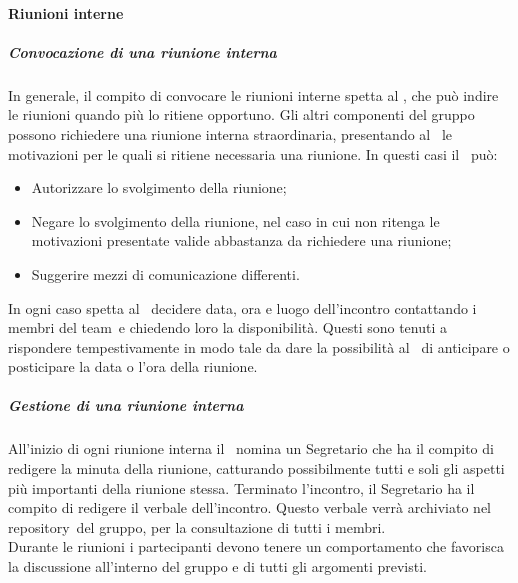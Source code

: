 \documentclass[../NormeProgetto.tex]{subfiles}
\begin{document}
			\paragraph{Riunioni interne}
			\subparagraph{Convocazione di una riunione interna}
			In generale, il compito di convocare le riunioni interne spetta al \responsabilediprogetto, che può indire le riunioni quando più lo ritiene opportuno. Gli altri componenti del gruppo possono richiedere una riunione interna straordinaria, presentando al \responsabilediprogetto\ le motivazioni per le quali si ritiene necessaria una riunione. In questi casi il \responsabilediprogetto\ può:
			\begin{itemize}
			\item Autorizzare lo svolgimento della riunione;
			\item Negare lo svolgimento della riunione, nel caso in cui non ritenga le motivazioni presentate valide abbastanza da richiedere una riunione;
			\item Suggerire mezzi di comunicazione differenti.
			\end{itemize}
			In ogni caso spetta al \responsabilediprogetto\ decidere data, ora e luogo dell'incontro contattando i membri del team\g\ e chiedendo loro la disponibilità. Questi sono tenuti a rispondere tempestivamente in modo tale da dare la possibilità al \responsabilediprogetto\ di anticipare o posticipare la data o l'ora della riunione.
			\subparagraph{Gestione di una riunione interna}
			All'inizio di ogni riunione interna il \responsabilediprogetto\ nomina un Segretario che ha il compito di redigere la minuta della riunione, catturando possibilmente tutti e soli gli aspetti più importanti della riunione stessa. Terminato l'incontro, il Segretario ha il compito di redigere il verbale dell'incontro. Questo verbale verrà archiviato nel repository\g\ del gruppo, per la consultazione di tutti i membri. \\ Durante le riunioni i partecipanti devono tenere un comportamento che favorisca la discussione all'interno del gruppo e di tutti gli argomenti previsti. 
\end{document}
